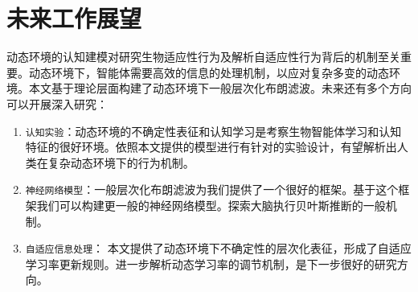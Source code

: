 \begin{enumerate}
	
\end{enumerate}

\section{未来工作展望}
动态环境的认知建模对研究生物适应性行为及解析自适应性行为背后的机制至关重要。动态环境下，智能体需要高效的信息的处理机制，以应对复杂多变的动态环境。本文基于理论层面构建了动态环境下一般层次化布朗滤波。未来还有多个方向可以开展深入研究：
\begin{enumerate}
	\item {\verb|认知实验|}：动态环境的不确定性表征和认知学习是考察生物智能体学习和认知特征的很好环境。依照本文提供的模型进行有针对的实验设计，有望解析出人类在复杂动态环境下的行为机制。
	\item {\verb|神经网络模型|}：一般层次化布朗滤波为我们提供了一个很好的框架。基于这个框架我们可以构建更一般的神经网络模型。探索大脑执行贝叶斯推断的一般机制。
	\item {\verb|自适应信息处理|}： 本文提供了动态环境下不确定性的层次化表征，形成了自适应学习率更新规则。进一步解析动态学习率的调节机制，是下一步很好的研究方向。
\end{enumerate}